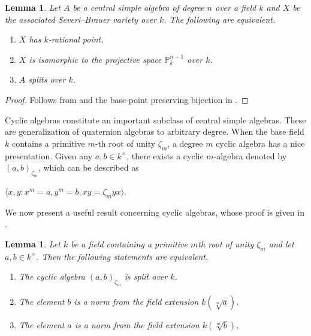 \documentclass[11pt]{amsart}
\theoremstyle{plain}
\newtheorem{lemma}[thm]{Lemma}
\theoremstyle{definition}
\renewcommand{\P}{{\mathbb P}}
\begin{document}
	\begin{lemma}\label{SB variety and rational point}
		Let $A$ be a central simple algebra of degree $n$ over a field $k$ and $X$ be the associated Severi--Brauer variety over $k$. The following are equivalent.
		\begin{enumerate}[label=\arabic*.]
			\item $X$ has $k$-rational point.
			\item $X$ is isomorphic to the projective space $\P^{n-1}_{k}$ over $k$.
			\item $A$ splits over $k$. 
		\end{enumerate}
		
	\end{lemma}
	
	\begin{proof}
    Follows from \cite[Theorem 5.1.3]{gs} and the base-point preserving bijection in \cite[p. 143]{gs}.
	\end{proof}
	
	Cyclic algebras constitute an important subclass of central simple algebras. These are generalization of quaternion algebras to arbitrary degree. When the base field $k$ contains a primitive $m$-th root of unity $\zeta_m$, a degree $m$ cyclic algebra has a nice presentation. Given any $a,b \in k^\times$, there exists a cyclic $m$-algebra denoted by $(a,b)_{\zeta_m} $, which can be described as
	\begin{center}
		$ \langle x,y : x^m = a, y^m = b, xy=\zeta_m yx\rangle$.
	\end{center}
	
	We now present a useful result concerning cyclic algebras, whose proof is given in \cite[Corollary 4.7.8]{gs}.
	
    \begin{lemma}\label{split algebra} Let $k$ be a field containing a primitive $m$th root of unity $\zeta_m$ and let $a,b \in k^\times$. Then the following statements are equivalent.
    \begin{enumerate}[label=\arabic*.]
		\item The cyclic algebra $(a,b)_{\zeta_m}$ is split over $k$.
		\item The element $b$ is a norm from the field extension $k(\sqrt[m]{a})$.
		\item The element $a$ is a norm from the field extension $k(\sqrt[m]{b})$.
    \end{enumerate}
    \end{lemma}
\end{document}
